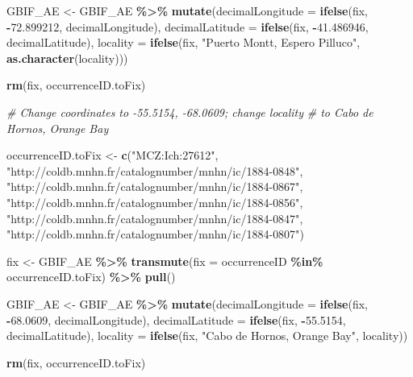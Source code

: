 \documentclass[sn-apa,pdflatex]{sn-jnl}
\newenvironment{Shaded}{\begin{snugshade}}{\end{snugshade}}
\newcommand{\AttributeTok}[1]{\textcolor[rgb]{0.13,0.29,0.53}{#1}}
\newcommand{\CommentTok}[1]{\textcolor[rgb]{0.56,0.35,0.01}{\textit{#1}}}
\newcommand{\FloatTok}[1]{\textcolor[rgb]{0.00,0.00,0.81}{#1}}
\newcommand{\FunctionTok}[1]{\textcolor[rgb]{0.13,0.29,0.53}{\textbf{#1}}}
\newcommand{\NormalTok}[1]{#1}
\newcommand{\OtherTok}[1]{\textcolor[rgb]{0.56,0.35,0.01}{#1}}
\newcommand{\SpecialCharTok}[1]{\textcolor[rgb]{0.81,0.36,0.00}{\textbf{#1}}}
\newcommand{\StringTok}[1]{\textcolor[rgb]{0.31,0.60,0.02}{#1}}
\begin{document}
\begin{Shaded}
\begin{Highlighting}[]
\NormalTok{GBIF\_AE }\OtherTok{\textless{}{-}}\NormalTok{ GBIF\_AE }\SpecialCharTok{\%\textgreater{}\%}
    \FunctionTok{mutate}\NormalTok{(}\AttributeTok{decimalLongitude =} \FunctionTok{ifelse}\NormalTok{(fix, }\SpecialCharTok{{-}}\FloatTok{72.899212}\NormalTok{, decimalLongitude),}
        \AttributeTok{decimalLatitude =} \FunctionTok{ifelse}\NormalTok{(fix, }\SpecialCharTok{{-}}\FloatTok{41.486946}\NormalTok{, decimalLatitude),}
        \AttributeTok{locality =} \FunctionTok{ifelse}\NormalTok{(fix, }\StringTok{"Puerto Montt, Espero Pilluco"}\NormalTok{,}
            \FunctionTok{as.character}\NormalTok{(locality)))}

\FunctionTok{rm}\NormalTok{(fix, occurrenceID.toFix)}

\CommentTok{\# Change coordinates to {-}55.5154, {-}68.0609; change locality}
\CommentTok{\# to \textquotesingle{}Cabo de Hornos, Orange Bay\textquotesingle{}}

\NormalTok{occurrenceID.toFix }\OtherTok{\textless{}{-}} \FunctionTok{c}\NormalTok{(}\StringTok{"MCZ:Ich:27612"}\NormalTok{, }\StringTok{"http://coldb.mnhn.fr/catalognumber/mnhn/ic/1884{-}0848"}\NormalTok{,}
    \StringTok{"http://coldb.mnhn.fr/catalognumber/mnhn/ic/1884{-}0867"}\NormalTok{, }\StringTok{"http://coldb.mnhn.fr/catalognumber/mnhn/ic/1884{-}0856"}\NormalTok{,}
    \StringTok{"http://coldb.mnhn.fr/catalognumber/mnhn/ic/1884{-}0847"}\NormalTok{, }\StringTok{"http://coldb.mnhn.fr/catalognumber/mnhn/ic/1884{-}0807"}\NormalTok{)}

\NormalTok{fix }\OtherTok{\textless{}{-}}\NormalTok{ GBIF\_AE }\SpecialCharTok{\%\textgreater{}\%}
    \FunctionTok{transmute}\NormalTok{(}\AttributeTok{fix =}\NormalTok{ occurrenceID }\SpecialCharTok{\%in\%}\NormalTok{ occurrenceID.toFix) }\SpecialCharTok{\%\textgreater{}\%}
    \FunctionTok{pull}\NormalTok{()}

\NormalTok{GBIF\_AE }\OtherTok{\textless{}{-}}\NormalTok{ GBIF\_AE }\SpecialCharTok{\%\textgreater{}\%}
    \FunctionTok{mutate}\NormalTok{(}\AttributeTok{decimalLongitude =} \FunctionTok{ifelse}\NormalTok{(fix, }\SpecialCharTok{{-}}\FloatTok{68.0609}\NormalTok{, decimalLongitude),}
        \AttributeTok{decimalLatitude =} \FunctionTok{ifelse}\NormalTok{(fix, }\SpecialCharTok{{-}}\FloatTok{55.5154}\NormalTok{, decimalLatitude),}
        \AttributeTok{locality =} \FunctionTok{ifelse}\NormalTok{(fix, }\StringTok{"Cabo de Hornos, Orange Bay"}\NormalTok{,}
\NormalTok{            locality))}

\FunctionTok{rm}\NormalTok{(fix, occurrenceID.toFix)}


\end{Highlighting}
\end{Shaded}
\end{document}
